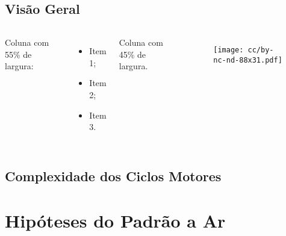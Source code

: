 \subsection{Visão Geral}

    \begin{frame}{}\vspace*{-2em}
        \begin{columns}
            Coluna com 55\% de largura:\\[\smallskipamount]
            \begin{itemize}
                \item<1-> Item 1;
                \item<2-> Item 2;
                \item<3-> Item 3.
            \end{itemize}
            Coluna com 45\% de largura.
            \begin{figure}
                \texttt{[image: cc/by-nc-nd-88x31.pdf]}
            \end{figure}
        \end{columns}
    \end{frame}

\subsection{Complexidade dos Ciclos Motores}

\section{Hipóteses do Padrão a Ar}

